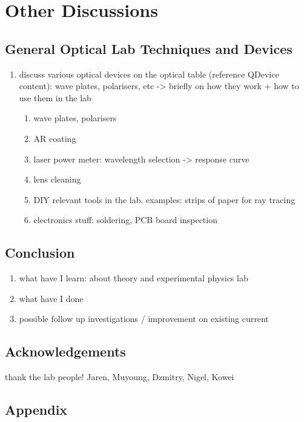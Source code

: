 \documentclass[12pt]{report}
\begin{document}
\chapter{Other Discussions}
\section{General Optical Lab Techniques and Devices}
\begin{enumerate}
    \item discuss various optical devices on the optical table (reference QDevice content): wave plates, polarisers, etc -> briefly on how they work + how to use them in the lab 
    \begin{enumerate}
        \item wave plates, polarisers
        \item AR coating
        \item laser power meter: wavelength selection -> response curve
        \item lens cleaning
        \item DIY relevant tools in the lab. examples: strips of paper for ray tracing
        \item electronics stuff: soldering, PCB board inspection
        
    \end{enumerate}
\end{enumerate}




\section{Conclusion}
\begin{enumerate}
    \item what have I learn: about theory and experimental physics lab
    \item what have I done 
    \item possible follow up investigations / improvement on existing current
\end{enumerate}

\section{Acknowledgements}
thank the lab people! Jaren, Muyoung, Dzmitry, Nigel, Kowei

\section{Appendix}
\end{document}
